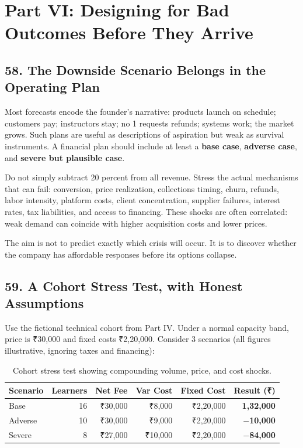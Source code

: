 \section*{Part VI: Designing for Bad Outcomes Before They Arrive}

\subsection*{58. The Downside Scenario Belongs in the Operating Plan}

Most forecasts encode the founder's narrative: products launch on schedule; customers pay; instructors stay; no 1 requests refunds; systems work; the market grows. Such plans are useful as descriptions of aspiration but weak as survival instruments. A financial plan should include at least a \textbf{base case}, \textbf{adverse case}, and \textbf{severe but plausible case}.

Do not simply subtract 20 percent from all revenue. Stress the actual mechanisms that can fail: conversion, price realization, collections timing, churn, refunds, labor intensity, platform costs, client concentration, supplier failures, interest rates, tax liabilities, and access to financing. These shocks are often correlated: weak demand can coincide with higher acquisition costs and lower prices.

The aim is not to predict exactly which crisis will occur. It is to discover whether the company has affordable responses before its options collapse.

\subsection*{59. A Cohort Stress Test, with Honest Assumptions}

Use the fictional technical cohort from Part IV. Under a normal capacity band, price is ₹30,000 and fixed costs ₹2,20,000. Consider 3 scenarios (all figures illustrative, ignoring taxes and financing):

\begin{table}[htbp]
\centering
\small
\begin{tabularx}{\textwidth}{lrrrrr}
\toprule
\textbf{Scenario} & \textbf{Learners} & \textbf{Net Fee} & \textbf{Var Cost} & \textbf{Fixed Cost} & \textbf{Result (₹)} \\
\midrule
Base & 16 & ₹30,000 & ₹8,000 & ₹2,20,000 & \textbf{1,32,000} \\
Adverse & 10 & ₹30,000 & ₹9,000 & ₹2,20,000 & \textbf{$-$10,000} \\
Severe & 8 & ₹27,000 & ₹10,000 & ₹2,20,000 & \textbf{$-$84,000} \\
\bottomrule
\end{tabularx}
\caption{Cohort stress test showing compounding volume, price, and cost shocks.}
\end{table}


